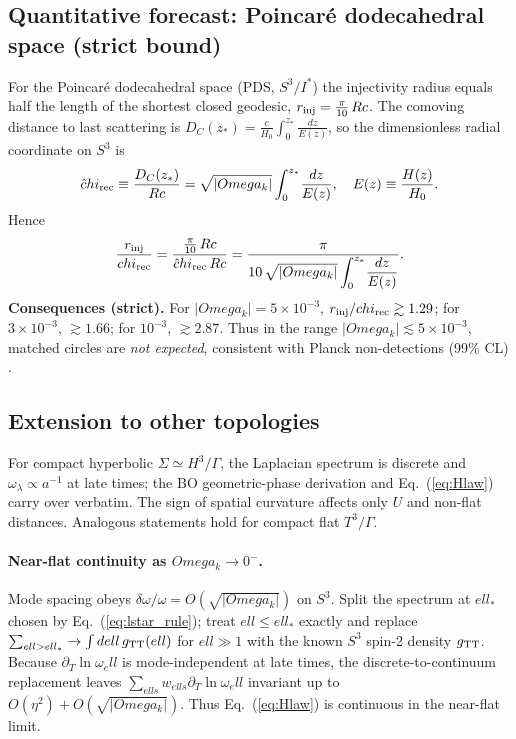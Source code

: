 \documentclass[aps,prd,twocolumn,amsmath,amssymb,nofootinbib,superscriptaddress]{revtex4-2}
\def\mathcal#1{#1}%
\def\Rc{Rc}%
\def\Omega{Omega}\def\sigma{sigma}\def\chi{chi}\def\ell{ell}%
\newcommand{\Rc}{\mathcal{R}_c}
\newcommand{\cU}{\mathcal{U}}
\begin{document}
\subsection*{Quantitative forecast: Poincar\'e dodecahedral space (strict bound)}
For the Poincar\'e dodecahedral space (PDS, $S^3/I^\ast$) the injectivity radius equals half the length of the shortest closed geodesic,
$r_{\rm inj}=\tfrac{\pi}{10}\,\Rc$.
The comoving distance to last scattering is
$D_C(z_\ast)=\frac{c}{H_0}\!\int_0^{z_\ast}\!\frac{dz}{E(z)}$,
so the dimensionless radial coordinate on $S^3$ is
\begin{equation}
\hat\chi_{\rm rec} \equiv \frac{D_C(z_\ast)}{\Rc}=\sqrt{|\Omega_k|}\int_0^{z_\ast}\!\frac{dz}{E(z)},\quad
E(z)\equiv\frac{H(z)}{H_0}.
\end{equation}
Hence
\begin{equation}
\frac{r_{\rm inj}}{\chi_{\rm rec}}=\frac{\tfrac{\pi}{10}\,\Rc}{\hat\chi_{\rm rec}\,\Rc}
=\frac{\pi}{10\,\sqrt{|\Omega_k|}\displaystyle\int_0^{z_\ast}\!\frac{dz}{E(z)}}.
\label{eq:rinj_ratio_exact}
\end{equation}
\textbf{Consequences (strict).} For $|\Omega_k|=5\times10^{-3}$, $r_{\rm inj}/\chi_{\rm rec}\gtrsim1.29$; for $3\times10^{-3}$, $\gtrsim1.66$; for $10^{-3}$, $\gtrsim2.87$. Thus in the range $|\Omega_k|\lesssim5\times10^{-3}$, matched circles are \emph{not expected}, consistent with Planck non-detections (99\% CL) \cite{Planck2015Topo}.

\subsection{Extension to other topologies}
For compact hyperbolic $\Sigma\simeq H^3/\Gamma$, the Laplacian spectrum is discrete and $\omega_\lambda\propto a^{-1}$ at late times; the BO geometric-phase derivation and Eq.~(\ref{eq:Hlaw}) carry over verbatim. The sign of spatial curvature affects only $\cU$ and non-flat distances. Analogous statements hold for compact flat $T^3/\Gamma$.

\paragraph*{Near-flat continuity as $\Omega_k\to 0^-$.}
Mode spacing obeys $\delta\omega/\omega=\mathcal O(\sqrt{|\Omega_k|})$ on $S^3$.
Split the spectrum at $\ell_*$ chosen by Eq.~(\ref{eq:lstar_rule}); treat $\ell\le\ell_*$ exactly and replace $\sum_{\ell>\ell_*}\to\int d\ell\,g_{\rm TT}(\ell)$ for $\ell\gg1$ with the known $S^3$ spin-2 density $g_{\rm TT}$.
Because $\partial_T\ln\omega_\ell$ is mode-independent at late times, the discrete-to-continuum replacement leaves $\sum_{\ell s}w_{\ell s}\partial_T\ln\omega_\ell$ invariant up to $\mathcal O(\eta^2)+\mathcal O(\sqrt{|\Omega_k|})$.
Thus Eq.~(\ref{eq:Hlaw}) is continuous in the near-flat limit.
\end{document}
